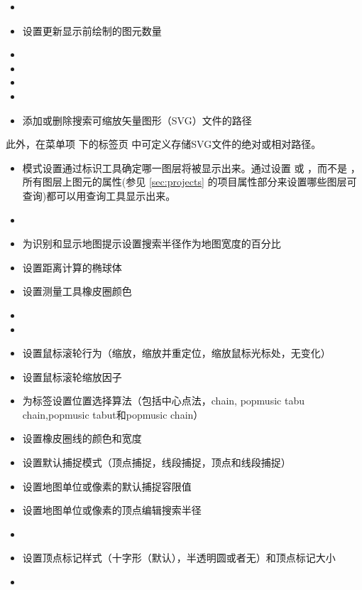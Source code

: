 
\begin{itemize}
\item {}
\item 设置更新显示前绘制的图元数量
\item {}
\item {}
\item {}
\item {}
\item 添加或删除搜索可缩放矢量图形（SVG）文件的路径
\end{itemize}

此外，在菜单项  \arrow {} 下的标签页  中可定义存储SVG文件的绝对或相对路径。


\begin{itemize}
\item 模式设置通过标识工具确定哪一图层将被显示出来。通过设置  或  ，而不是 ，所有图层上图元的属性(参见 \ref{sec:projects} 的项目属性部分来设置哪些图层可查询)都可以用查询工具显示出来。
\item {}
\item 为识别和显示地图提示设置搜索半径作为地图宽度的百分比
\item 设置距离计算的椭球体
\item 设置测量工具橡皮圈颜色
\item {}
\item {}
\item 设置鼠标滚轮行为（缩放，缩放并重定位，缩放鼠标光标处，无变化）
\item 设置鼠标滚轮缩放因子
\end{itemize}


\begin{itemize}
\item 为标签设置位置选择算法（包括中心点法，chain, popmusic tabu chain,popmusic tabut和popmusic chain）
\end{itemize}


\begin{itemize}
\item 设置橡皮圈线的颜色和宽度
\item 设置默认捕捉模式（顶点捕捉，线段捕捉，顶点和线段捕捉）
\item 设置地图单位或像素的默认捕捉容限值
\item 设置地图单位或像素的顶点编辑搜索半径
\item {}
\item 设置顶点标记样式（十字形（默认），半透明圆或者无）和顶点标记大小
\item {}
\end{itemize}

